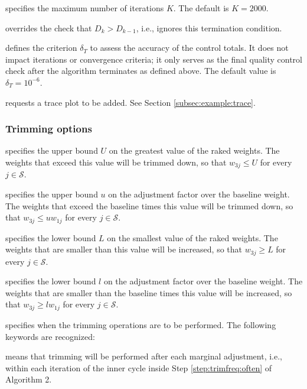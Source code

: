 \hangpara
{} specifies the maximum number
of iterations $K$. The default is $K=2000$.

\hangpara
{} overrides the check
that $D_k > D_{k-1}$, i.e., ignores this termination condition.

\hangpara
{} defines the criterion $\delta_T$ to
assess the accuracy of the control totals. It does not impact
iterations or convergence criteria; it only serves as the final quality control check
after the algorithm terminates as defined above. The default value is $\delta_T=10^{-6}$.

\hangpara
{} requests a trace plot to be added. See
Section \ref{subsec:example:trace}.

\subsubsection{Trimming options}
\label{subsubsec:trimming}

\hangpara
{} specifies the upper bound $U$ on the greatest
    value of the raked weights.  The weights that
    exceed this value will be trimmed down, so that
    $w_{3j} \le U$ for every $j\in\mathcal{S}$.

\hangpara
{} specifies the upper bound $u$ on the adjustment
    factor over the baseline weight. The weights
    that exceed the baseline times this value will be trimmed down,
    so that $w_{3j} \le u w_{1j}$ for every $j\in\mathcal{S}$.

\hangpara
{} specifies the lower bound $L$ on the smallest value
    of the raked weights.  The weights that are smaller than this value will
    be increased, so that $w_{3j} \ge L$ for every $j\in\mathcal{S}$.

\hangpara
{} specifies the lower bound $l$ on the adjustment factor
    over the baseline weight.  The weights that are smaller than the baseline
    times this value will be increased, so that
    $w_{3j} \ge l w_{1j}$ for every $j\in\mathcal{S}$.

\hangpara
{} specifies when the trimming operations
    are to be performed. The following keywords are recognized:

\morehang {} means that trimming will be performed
    after each marginal adjustment, i.e., within each iteration of the inner
    cycle inside Step \ref{step:trimfreq:often} of Algorithm 2.

